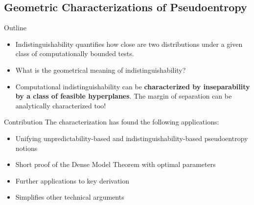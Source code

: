 \documentclass[10pt]{beamer}					%
\begin{document}
\subsection{Geometric Characterizations of Pseudoentropy }

\begin{frame}{Outline}
\begin{itemize}
\item[\emoji{open-book}] Indistinguishability quantifies how close are two distributions under a given class of computationally bounded tests. 
\item[\emoji{question}] What is the geometrical meaning of indistinguishability?
\item[\emoji{raised-hand}] Computational indistinguishability can be \textbf{characterized by inseparability by a class of feasible hyperplanes}. The margin of separation can be analytically characterized too! 
\end{itemize}
\end{frame}

\begin{frame}{Contribution}
The characterization has found the following applications:
\begin{itemize}
    \item[\emoji{key}] Unifying unpredictability-based and indistinguishability-based pseudoentropy notions~\cite{DBLP:conf/icalp/SkorskiGP15}
    \item[\emoji{key}] Short proof of the Dense Model Theorem with optimal parameters~\cite{DBLP:conf/icits/Skorski15a}
    \item[\emoji{key}] Further applications to key derivation~\cite{Skorski17a}
    \item[\emoji{key}] Simplifies other technical arguments~\cite{DBLP:conf/stoc/VadhanZ12}
\end{itemize}
\end{frame}
\end{document}
